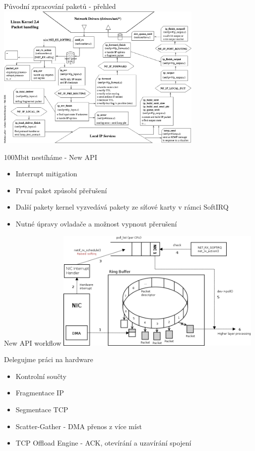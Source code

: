 \documentclass{beamer}
\begin{document}
\begin{frame}{Původní zpracování paketů - přehled}
	\centering
	\includegraphics[width=10cm,keepaspectratio]{fig/kernel_24.png}
\end{frame}

\begin{frame}{100Mbit nestíháme - New API}
	\begin{itemize}
		\item Interrupt mitigation
		\item První paket způsobí přeřušení
		\item Další pakety kernel vyzvedává pakety ze síťové karty v rámci SoftIRQ
		\item Nutné úpravy ovladače a možnost vypnout přerušení
	\end{itemize}
\end{frame}

\begin{frame}{New API workflow}
	\centering
	\includegraphics[width=10cm,keepaspectratio]{fig/napi-workflow.png}
\end{frame}

\begin{frame}{Delegujme práci na hardware}
	\begin{itemize}
		\item Kontrolní součty
		\item Fragmentace IP
		\item Segmentace TCP
		\item Scatter-Gather - DMA přenos z více míst
		\item TCP Offload Engine - ACK, otevírání a uzavírání spojení
	\end{itemize}
\end{frame}
\end{document}
